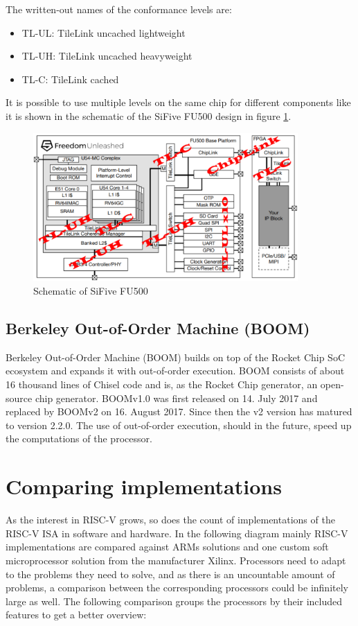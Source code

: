 The written-out names of the conformance levels are:
\begin{itemize}
    \item TL-UL: TileLink uncached lightweight
    \item TL-UH: TileLink uncached heavyweight
    \item TL-C: TileLink cached
\end{itemize}
It is possible to use multiple levels on the same chip for
different components like it is shown in the schematic of the
SiFive FU500 design in figure \ref{fig:sifive_fu500}.
\begin{figure}
    \centering
    \includegraphics[width=0.9\textwidth]{figures/sifive_fu500}
    \caption{Schematic of SiFive FU500
        \cite[p.~25]{risc-v_tilelink}}
    \label{fig:sifive_fu500}
\end{figure}

\subsection{Berkeley Out-of-Order Machine (BOOM)}
Berkeley Out-of-Order Machine (BOOM) builds on top
of the Rocket Chip SoC ecosystem and expands
it with out-of-order execution. BOOM consists of
about 16 thousand lines of Chisel code and is,
as the Rocket Chip generator, an open-source chip generator.
BOOMv1.0 was first released on 14. July 2017 and
replaced by BOOMv2 on 16. August 2017.
Since then the v2 version has matured to version
2.2.0. The use of out-of-order execution, should in
the future, speed up the computations of the processor.


\section{Comparing implementations}
As the interest in RISC-V grows, so does the count of implementations
of the RISC-V ISA in software and hardware. In the following diagram
mainly RISC-V implementations are compared against ARMs solutions and one
custom soft microprocessor solution from the manufacturer Xilinx.
Processors need to adapt to the problems they need to solve, and
as there is an uncountable amount of problems, a 
comparison between the corresponding processors could be
infinitely large as well.
The following comparison groups the processors by their included
features to get a better overview:

